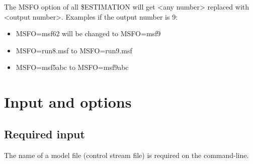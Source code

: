 \noindent The MSFO option of all \$ESTIMATION will get <any number> replaced with <output number>. 
Examples if the output number is 9:
\begin{itemize}
\item MSFO=msf62 will be changed to MSFO=msf9
\item MSFO=run8.msf to MSFO=run9.msf
\item MSFO=msf5abc to MSFO=msf9abc
\end{itemize}
\section{Input and options}

\subsection{Required input}
The name of a model file (control stream file) is required on the command-line.

